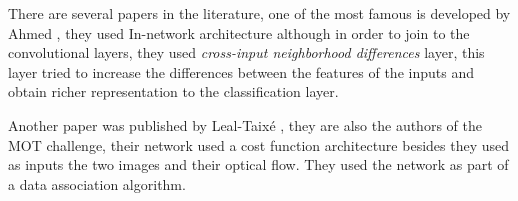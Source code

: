 There are several papers in the literature, one of the most famous is developed by Ahmed \cite{ahmed}, they used In-network architecture although in order to join to the convolutional layers, they used \textit{cross-input neighborhood differences} layer, this layer tried to increase the differences between the features of the inputs and obtain richer representation to the classification layer.

Another paper was published by Leal-Taixé \cite{lealTaixe}, they are also the authors of the MOT challenge, their network used a cost function architecture besides they used as inputs the two images and their optical flow. They used the network as part of a data association algorithm.


